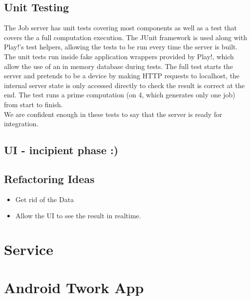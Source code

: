\documentclass[a4paper,10pt]{article}
\begin{document}
\subsection{Unit Testing}

The Job server has unit tests covering most components as well as a test that covers the a full computation execution.
The JUnit framework is used along with Play!'s test helpers, allowing the tests to be run every time the server is built.\\
The unit tests run inside fake application wrappers provided by Play!, which allow the use of an in memory database during tests.
The full test starts the server and pretends to be a device by making HTTP requests to localhost,
the internal server state is only accessed directly to check the result is correct at the end.
The test runs a prime computation (on 4, which generates only one job) from start to finish.\\

We are confident enough in these tests to say that the server is ready for integration.

\subsection{UI - incipient phase :)}

\subsection{Refactoring Ideas}

\begin{itemize}
\item Get rid of the Data
\item Allow the UI to see the result in realtime.
\end{itemize}

\section{Service}

\section{Android Twork App}
\end{document}
